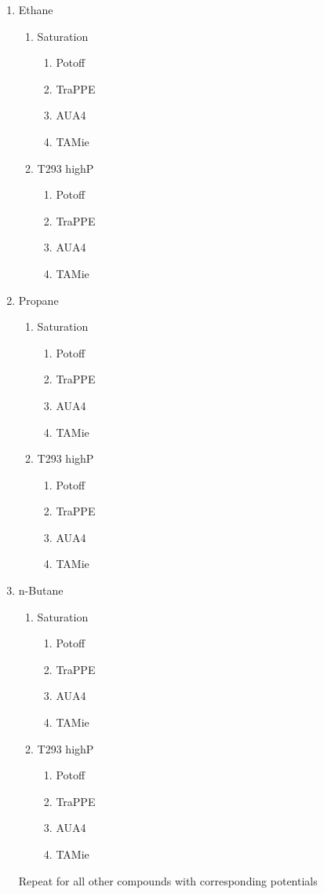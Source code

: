 \documentclass[preprint,review,12pt]{elsarticle}
\begin{document}
\begin{enumerate}
	\item Ethane
	\begin{enumerate}
		\item Saturation
        \begin{enumerate}
        	\item Potoff
        	\item TraPPE
        	\item AUA4
        	\item TAMie
        \end{enumerate}
		\item T293 highP
		\begin{enumerate}
			\item Potoff
			\item TraPPE
			\item AUA4
			\item TAMie
		\end{enumerate}
	\end{enumerate}
    \item Propane
   	\begin{enumerate}
    	\item Saturation
    	\begin{enumerate}
    		\item Potoff
    		\item TraPPE
    		\item AUA4
    		\item TAMie
    	\end{enumerate}
    	\item T293 highP
    	\begin{enumerate}
    		\item Potoff
    		\item TraPPE
    		\item AUA4
    		\item TAMie
    	\end{enumerate}
    \end{enumerate}
    \item n-Butane
    \begin{enumerate}
    	\item Saturation
    	\begin{enumerate}
    		\item Potoff
    		\item TraPPE
    		\item AUA4
    		\item TAMie
    	\end{enumerate}
    	\item T293 highP
    	\begin{enumerate}
    		\item Potoff
    		\item TraPPE
    		\item AUA4
    		\item TAMie
    	\end{enumerate}
    \end{enumerate}
    Repeat for all other compounds with corresponding potentials    
\end{enumerate}
\end{document}
